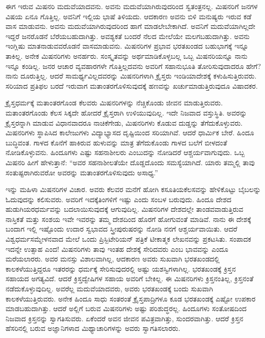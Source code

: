 ಈಗ ಇರುವ ಮಿಷನರಿ ಮದುವೆಯಾದವನು. ಅವನು ಮದುವೆಯಾಗಿರುವುದರಿಂದ ಸ್ವತಂತ್ರನಲ್ಲ. ಮಿಷನರಿಗೆ ಜನಗಳ ವಿಷಯ ಏನೂ ಗೊತ್ತಿಲ್ಲ. ಅವನಿಗೆ ಇಲ್ಲಿಯ ಭಾಷೆ ತಿಳಿಯದು. ಆದಕಾರಣ ಅವನು ಬಿಳಿ ಮನುಷ್ಯರು ಇರುವ ಕಡೆ ವಾಸ ಮಾಡುವನು. ಅವನು ಮದುವೆಯಾಗಿರುವುದರಿಂದ ಹಾಗೆ ಮಾಡಲೇಬೇಕಾಗಿದೆ. ಅವನಿಗೆ ಮದುವೆಯಾಗಿಲ್ಲದೇ ಇದ್ದರೆ ಜನರೊಡನೆ ಬೆರೆಯಬಹುದಾಗಿತ್ತು. ಅವಶ್ಯಕತೆ ಬಂದರೆ ನೆಲದ ಮೇಲೆಯೇ ಮಲಗಬಹುದಾಗಿತ್ತು. ಅವನು ಇಂಗ್ಲಿಷು ಮಾತನಾಡುವವರೊಡನೆ ವಾಸಮಾಡುವನು. ಮಿಷನರಿಗಳ ಪ್ರಭಾವ ಭರತಖಂಡದ ಬಹುಭಾಗಕ್ಕೆ ಇನ್ನೂ ತಾಕಿಲ್ಲ. ಅನೇಕ ಮಿಷನರಿಗಳು ಅನರ್ಹರು. ಸಂಸ್ಕೃತವನ್ನು ಅರ್ಥಮಾಡಿಕೊಳ್ಳಬಲ್ಲ ಒಬ್ಬ ಮಿಷನರಿಯನ್ನೂ ನಾನು ಇನ್ನೂ ಕಂಡಿಲ್ಲ. ಜನರ ಆಚಾರ ವ್ಯವಹಾರಗಳೇ ಗೊತ್ತಿಲ್ಲದವನು ಅವರಿಗೆ ಸಹಾನುಭೂತಿ ತೋರಿಸುವುದಾದರೂ ಹೇಗೆ? ನಾನು ದೂರುತ್ತಿಲ್ಲ. ಆದರೆ ಸಾಮರ್ಥ್ಯವಿಲ್ಲದವರನ್ನು ಮಿಷನರಿಗಳಾಗಿ ಕ್ರೈಸ್ತರು ಇಂಡಿಯಾದೇಶಕ್ಕೆ ಕಳುಹಿಸುತ್ತಿರುವರು. ಸರಿಯಾದ ಪ್ರತಿಫಲ ಬರದೆ ಇರುವಾಗ ಮತಾಂತರಗೊಳಿಸುವುದಕ್ಕೆ ಹಣವನ್ನು ಖರ್ಚುಮಾಡುತ್ತಿರುವುದೂ ವಿಷಾದಕರ.

\vskip 4pt

ಕ್ರೈಸ್ತಧರ್ಮಕ್ಕೆ ಮತಾಂತರಗೊಂಡ ಕೆಲವರು ಮಿಷನರಿಗಳನ್ನು ನೆಚ್ಚಿಕೊಂಡು ಜೀವನ ಮಾಡುತ್ತಿರುವರು. ಮತಾಂತರಗೊಂಡು ಕೆಲಸ ಸಿಕ್ಕದೇ ಹೋದರೆ ಕ್ರೈಸ್ತರಾಗಿ ಉಳಿಯುವುದಿಲ್ಲ. ಇದೇ ನಿಜವಾದ ವಸ್ತುಸ್ಥಿತಿ. ಅವರನ್ನು ಕ್ರೈಸ್ತರನ್ನಾಗಿ ಮಾಡುವ ವಿಧಾನವಾದರೂ ನಾಚಿಕೆಗೇಡು, ಮಿಷನರಿಗಳು ಕೊಡುವ ದುಡ್ಡನ್ನು ತೆಗೆದುಕೊಳ್ಳುವರು. ಮಿಷನರಿಗಳು ಸ್ಥಾಪಿಸಿದ ಕಾಲೇಜುಗಳು ವಿದ್ಯಾಭ್ಯಾಸದ ದೃಷ್ಟಿಯಿಂದ ಸರಿಯಾಗಿವೆ. ಆದರೆ ಧಾರ್ಮಿಕ ಬೇರೆ. ಹಿಂದೂ ಬುದ್ಧಿವಂತ. ಗಾಳದ ಕೊನೆಗೆ ಹಾಕಿರುವ ಹುಳುವನ್ನು ಮಾತ್ರ ತೆಗೆದುಕೊಂಡು ಗಾಳದ ಬಲೆಗೆ ಬೀಳದಂತೆ ನೋಡಿಕೊಳ್ಳುವನು. ಹಿಂದೂಗಳು ಎಷ್ಟು ಸಹನಾಶೀಲರು ಎಂಬುದನ್ನು ನೋಡಿದರೆ ಆಶ್ಚರ್ಯವಾಗುವುದು. ಒಬ್ಬ ಮಿಷನರಿ ಹೀಗೆ ಹೇಳುತ್ತಾನೆ: “ಅವರ ಸಹನಾಶೀಲತೆಯೇ ದೊಡ್ಡದೊಂದು ಸಮಸ್ಯೆಯಾಗಿದೆ. ಯಾರು ತಮ್ಮಲ್ಲಿ ತಾವು ಸಂತುಷ್ಟರಾಗಿರುವರೋ ಅವರನ್ನು ಮತಾಂತರಗೊಳಿಸುವುದು ಅಸಾಧ್ಯ.”

\vskip 4pt

ಇನ್ನು ಮಹಿಳಾ ಮಿಷನರಿಗಳ ವಿಚಾರ. ಅವರು ಕೆಲವರ ಮನೆಗೆ ಹೋಗಿ ಕಸೂತಿಯ\break ಕೆಲಸವನ್ನು ಹೇಳಿಕೊಟ್ಟು ಬೈಬಲನ್ನು ಓದುವುದನ್ನು ಕಲಿಸುವರು. ಅವರಿಗೆ ಇದಕ್ಕೆ\break ತಿಂಗಳಿಗೆ ಇಷ್ಟು ಎಂದು ಸಂಬಳ ಬರುವುದು. ಹಿಂದೂ ದೇಶದ ಹುಡುಗಿಯರ\break ಧರ್ಮವನ್ನು ಬದಲಾಯಿಸುವುದಕ್ಕೆ ಆಗುವುದಿಲ್ಲ. ಮಿಷನರಿಗಳ ದೇಶದಲ್ಲೇ ತಾಂಡವವಾಡುತ್ತಿರುವ ನಾಸ್ತಿಕತೆ ಮತ್ತು ಸಂಶಯ ಇವೇ ಇವರನ್ನು ತಮ್ಮ ದೇಶದಿಂದ ಹೊರಗೆ ಹೋಗುವಂತೆ ಮಾಡಿವೆ. ನಾನು ಈ ದೇಶಕ್ಕೆ ಬಂದಾಗ ಇಲ್ಲಿ ಇಷ್ಟೊಂದು ಉದಾರ ಸ್ವಭಾವದ ಸ್ತ್ರೀಪುರುಷರನ್ನು ನೋಡಿ ನನಗೆ ಆಶ್ಚರ್ಯವಾಯಿತು. ಆದರೆ ವಿಶ್ವಧರ್ಮಸಮ್ಮೇಳನವಾದ ಮೇಲೆ ಒಂದು ಪ್ರಿಸ್ಬಿಟೇರಿಯನ್​ ಪತ್ರಿಕೆ ಟೀಕಾತ್ಮಕ ಲೇಖನವನ್ನು ಪ್ರಕಟಸಿತು. ಸಂಪಾದಕ ಇದನ್ನೇ ಉತ್ಸಾಹ ಎಂದ! ಮಿಷನರಿಗಳು ತಾವು ಇಂತಹ ದೇಶಕ್ಕೆ ಸೇರಿದವರು ಎಂಬ ಭಾವವನ್ನು ಎಂದೂ ಮರೆಯಲಾರರು. ಅವರ ಮನಸ್ಸು ವಿಶಾಲವಾಗಿಲ್ಲ, ಆದಕಾರಣ ಅವರು ಸುಖವಾಗಿ ಭರತಖಂಡದಲ್ಲಿ ಕಾಲಕಳೆಯುತ್ತಿದ್ದರೂ ಇತರರನ್ನು ಧರ್ಮಕ್ಕೆ ಸೇರಿಸುವುದರಲ್ಲಿ ಅಷ್ಟು ಯಶಸ್ವಿಗಳಾಗಿಲ್ಲ. ಭರತಖಂಡಕ್ಕೆ ಕ್ರಿಸ್ತನ ಸಹಾಯದ ಅಗತ್ಯವಿದೆ. ಆದರೆ ಕ್ರಿಸ್ತದ್ವೇಷಿಗಳ ಸಹಾಯ ಅವರಿಗೆ ಬೇಕಿಲ್ಲ. ಈ ಮಿಷನರಿಗಳು ಕ್ರಿಸ್ತನಂತಿಲ್ಲ, ಕ್ರಿಸ್ತನಂತೆ ನಡೆದುಕೊಳ್ಳುವುದಿಲ್ಲ. ಅವರೆಲ್ಲ ಮದುವೆಯಾದವರು, ಅವರು ಭರತಖಂಡಕ್ಕೆ ಬಂದು ಸುಖವಾಗಿ ಕಾಲಕಳೆಯುತ್ತಿರುವರು. ಅನೇಕ ಹಿಂದೂ ಸಾಧು ಸಂತರಂತೆ ಕ್ರೈಸ್ತಪಾದ್ರಿಗಳೂ ಕೂಡ ಭರತಖಂಡಕ್ಕೆ ಎಷ್ಟೋ ಉಪಕಾರ ಮಾಡಬಹುದಾಗಿತ್ತು. ಆದರೆ ಅಲ್ಲಿಗೆ ಬರುವ ಮಿಷನರಿಗಳು ಅಷ್ಟು ಪರಿಶುದ್ಧರಲ್ಲ. ಹಿಂದೂಗಳು ಸಂತೋಷದಿಂದ ನಿಜವಾದ ಕ್ರಿಸ್ತನನ್ನು ಸ್ವಾಗತಿಸುವರು. ಏಕೆಂದರೆ ಅವನ ಜೀವನ ಪವಿತ್ರವಾಗಿತ್ತು, ಸುಂದರವಾಗಿತ್ತು. ಆದರೆ ಕ್ರಿಸ್ತನ ಹೆಸರಿನಲ್ಲಿ ಬರುವ ಅಜ್ಞಾನಿಗಳಾದ ಮಿಥ್ಯಾಚಾರಿಗಳನ್ನು ಅವರು ಸ್ವಾಗತಿಸಲಾರರು.


